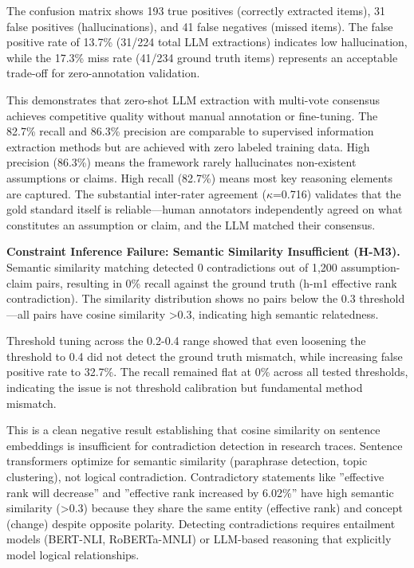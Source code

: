 The confusion matrix shows 193 true positives (correctly extracted items), 31 false positives (hallucinations), and 41 false negatives (missed items). The false positive rate of 13.7\% (31/224 total LLM extractions) indicates low hallucination, while the 17.3\% miss rate (41/234 ground truth items) represents an acceptable trade-off for zero-annotation validation.

This demonstrates that zero-shot LLM extraction with multi-vote consensus achieves competitive quality without manual annotation or fine-tuning. The 82.7\% recall and 86.3\% precision are comparable to supervised information extraction methods but are achieved with zero labeled training data. High precision (86.3\%) means the framework rarely hallucinates non-existent assumptions or claims. High recall (82.7\%) means most key reasoning elements are captured. The substantial inter-rater agreement ($\kappa$=0.716) validates that the gold standard itself is reliable---human annotators independently agreed on what constitutes an assumption or claim, and the LLM matched their consensus.

\textbf{Constraint Inference Failure: Semantic Similarity Insufficient (H-M3).} Semantic similarity matching detected 0 contradictions out of 1,200 assumption-claim pairs, resulting in 0\% recall against the ground truth (h-m1 effective rank contradiction). The similarity distribution shows no pairs below the 0.3 threshold---all pairs have cosine similarity >0.3, indicating high semantic relatedness.

Threshold tuning across the 0.2-0.4 range showed that even loosening the threshold to 0.4 did not detect the ground truth mismatch, while increasing false positive rate to 32.7\%. The recall remained flat at 0\% across all tested thresholds, indicating the issue is not threshold calibration but fundamental method mismatch.

This is a clean negative result establishing that cosine similarity on sentence embeddings is insufficient for contradiction detection in research traces. Sentence transformers optimize for semantic similarity (paraphrase detection, topic clustering), not logical contradiction. Contradictory statements like ''effective rank will decrease'' and ''effective rank increased by 6.02\%'' have high semantic similarity (>0.3) because they share the same entity (effective rank) and concept (change) despite opposite polarity. Detecting contradictions requires entailment models (BERT-NLI, RoBERTa-MNLI) or LLM-based reasoning that explicitly model logical relationships.

